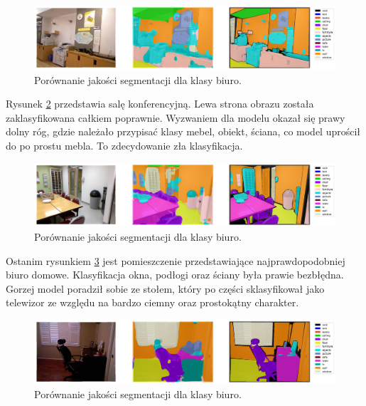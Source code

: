 \begin{figure}[ht!]
    \centering
    \includegraphics[width=\textwidth]{img/preds_analysis/gt_vs_pred/office-1.png}
    \caption{Porównanie jakości segmentacji dla klasy biuro.}
    \label{fig:office-pred-1}
\end{figure}

Rysunek \ref{fig:office-pred-2} przedstawia salę konferencyjną. Lewa strona obrazu została zaklasyfikowana całkiem poprawnie. Wyzwaniem dla modelu okazał się prawy dolny róg, gdzie należało przypisać klasy mebel, obiekt, ściana, co model uprościł do po prostu mebla. To zdecydowanie zła klasyfikacja.

\begin{figure}[ht!]
    \centering
    \includegraphics[width=\textwidth]{img/preds_analysis/gt_vs_pred/office-2.png}
    \caption{Porównanie jakości segmentacji dla klasy biuro.}
    \label{fig:office-pred-2}
\end{figure}

Ostanim rysunkiem {\ref{fig:office-pred-3}} jest pomieszczenie przedstawiające najprawdopodobniej biuro domowe. Klasyfikacja okna, podłogi oraz ściany była prawie bezbłędna. Gorzej model poradził sobie ze stołem, który po części sklasyfikował jako telewizor ze względu na bardzo ciemny oraz prostokątny charakter.

\begin{figure}[ht!]
    \centering
    \includegraphics[width=\textwidth]{img/preds_analysis/gt_vs_pred/office-3.png}
    \caption{Porównanie jakości segmentacji dla klasy biuro.}
    \label{fig:office-pred-3}
\end{figure}

